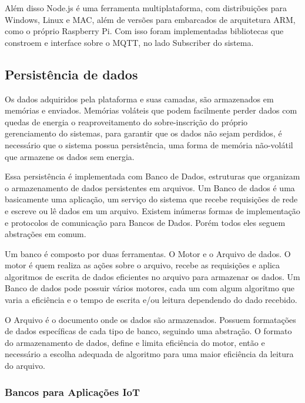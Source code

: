 Além disso Node.js é uma ferramenta multiplataforma, com distribuições para Windows, Linux e MAC, além de versões para embarcados de arquitetura ARM, como o próprio Raspberry Pi. Com isso foram implementadas bibliotecas que constroem e interface sobre o MQTT, no lado Subscriber do sistema.

\subsection{Persistência de dados}
\label{subsection:persistencia}

Os dados adquiridos pela plataforma e suas camadas, são armazenados em memórias e enviados. Memórias voláteis que podem facilmente perder dados com quedas de energia o reaproveitamento do sobre-inscrição do próprio gerenciamento do sistemas, para garantir que os dados não sejam perdidos, é necessário que o sistema possua persistência, uma forma de memória não-volátil que armazene os dados sem energia.

Essa persistência é implementada com Banco de Dados, estruturas que organizam o armazenamento de dados persistentes em arquivos. Um Banco de dados é uma basicamente uma aplicação, um serviço do sistema que recebe requisições de rede e escreve ou lê dados em um arquivo. Existem inúmeras formas de implementação e protocolos de comunicação para Bancos de Dados. Porém todos eles seguem abstrações em comum.

Um banco é composto por duas ferramentas. O Motor e o Arquivo de dados. O motor é quem realiza as ações sobre o arquivo, recebe as requisições e aplica algoritmos de escrita de dados eficientes no arquivo para armazenar os dados. Um Banco de dados pode possuir vários motores, cada um com algum algoritmo que varia a eficiência e o tempo de escrita e/ou leitura dependendo do dado recebido.

O Arquivo é o documento onde os dados são armazenados. Possuem formatações de dados específicas de cada tipo de banco, seguindo uma abstração. O formato do armazenamento de dados, define e limita eficiência do motor, então e necessário a escolha adequada de algoritmo para uma maior eficiência da leitura do arquivo.


 
\subsubsection{Bancos para Aplicações IoT}
\label{subsubsection:bancos_IoT}

